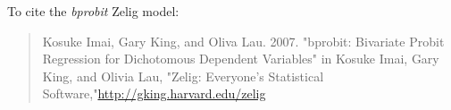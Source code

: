 To cite the \emph{ bprobit } Zelig model:
 \begin{verse}
 Kosuke Imai, Gary King, and Oliva Lau. 2007. "bprobit: Bivariate Probit Regression for Dichotomous Dependent Variables" in Kosuke Imai, Gary King, and Olivia Lau, "Zelig: Everyone's Statistical Software,"\url{http://gking.harvard.edu/zelig} 
\end{verse}